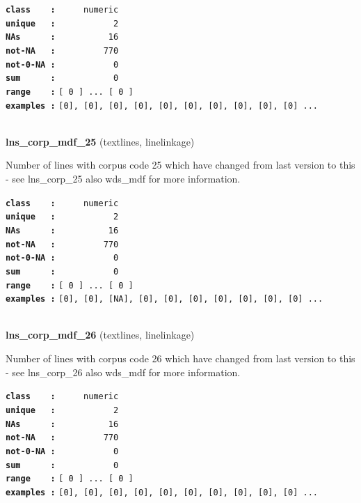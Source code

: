 \documentclass[]{article}
\begin{document}
\textbf{\texttt{class\ \ \ \ :}} \texttt{~~~~~numeric}\\
\textbf{\texttt{unique\ \ \ :}} \texttt{~~~~~~~~~~~2}\\
\textbf{\texttt{NAs\ \ \ \ \ \ :}} \texttt{~~~~~~~~~~16}\\
\textbf{\texttt{not-NA\ \ \ :}} \texttt{~~~~~~~~~770}\\
\textbf{\texttt{not-0-NA\ :}} \texttt{~~~~~~~~~~~0}\\
\textbf{\texttt{sum\ \ \ \ \ \ :}} \texttt{~~~~~~~~~~~0}\\
\textbf{\texttt{range\ \ \ \ :}}
\texttt{{[}\ 0\ {]}\ ...\ {[}\ 0\ {]}}\\
\textbf{\texttt{examples\ :}}
\texttt{{[}0{]},\ {[}0{]},\ {[}0{]},\ {[}0{]},\ {[}0{]},\ {[}0{]},\ {[}0{]},\ {[}0{]},\ {[}0{]},\ {[}0{]}\ ...}\\

~

\textbf{lns\_corp\_mdf\_25} (textlines, linelinkage)

Number of lines with corpus code 25 which have changed from last version
to this - see lns\_corp\_25 also wds\_mdf for more information.

\textbf{\texttt{class\ \ \ \ :}} \texttt{~~~~~numeric}\\
\textbf{\texttt{unique\ \ \ :}} \texttt{~~~~~~~~~~~2}\\
\textbf{\texttt{NAs\ \ \ \ \ \ :}} \texttt{~~~~~~~~~~16}\\
\textbf{\texttt{not-NA\ \ \ :}} \texttt{~~~~~~~~~770}\\
\textbf{\texttt{not-0-NA\ :}} \texttt{~~~~~~~~~~~0}\\
\textbf{\texttt{sum\ \ \ \ \ \ :}} \texttt{~~~~~~~~~~~0}\\
\textbf{\texttt{range\ \ \ \ :}}
\texttt{{[}\ 0\ {]}\ ...\ {[}\ 0\ {]}}\\
\textbf{\texttt{examples\ :}}
\texttt{{[}0{]},\ {[}0{]},\ {[}NA{]},\ {[}0{]},\ {[}0{]},\ {[}0{]},\ {[}0{]},\ {[}0{]},\ {[}0{]},\ {[}0{]}\ ...}\\

~

\textbf{lns\_corp\_mdf\_26} (textlines, linelinkage)

Number of lines with corpus code 26 which have changed from last version
to this - see lns\_corp\_26 also wds\_mdf for more information.

\textbf{\texttt{class\ \ \ \ :}} \texttt{~~~~~numeric}\\
\textbf{\texttt{unique\ \ \ :}} \texttt{~~~~~~~~~~~2}\\
\textbf{\texttt{NAs\ \ \ \ \ \ :}} \texttt{~~~~~~~~~~16}\\
\textbf{\texttt{not-NA\ \ \ :}} \texttt{~~~~~~~~~770}\\
\textbf{\texttt{not-0-NA\ :}} \texttt{~~~~~~~~~~~0}\\
\textbf{\texttt{sum\ \ \ \ \ \ :}} \texttt{~~~~~~~~~~~0}\\
\textbf{\texttt{range\ \ \ \ :}}
\texttt{{[}\ 0\ {]}\ ...\ {[}\ 0\ {]}}\\
\textbf{\texttt{examples\ :}}
\texttt{{[}0{]},\ {[}0{]},\ {[}0{]},\ {[}0{]},\ {[}0{]},\ {[}0{]},\ {[}0{]},\ {[}0{]},\ {[}0{]},\ {[}0{]}\ ...}\\
\end{document}
